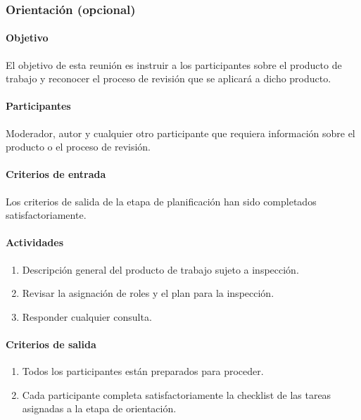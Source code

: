 \subsubsection{Orientación (opcional)}

\paragraph{Objetivo\\}

El objetivo de esta reunión es instruir a los participantes sobre el producto de trabajo y reconocer el proceso de revisión que se aplicará a dicho producto.

\paragraph{Participantes\\}

Moderador, autor y cualquier otro participante que requiera información sobre el producto o el proceso de revisión.

\paragraph{Criterios de entrada\\}

Los criterios de salida de la etapa de planificación han sido completados satisfactoriamente.

\paragraph{Actividades}

\begin{enumerate}
	\item 
		Descripción general del producto de trabajo sujeto a inspección.
	\item
		Revisar la asignación de roles y el plan para la inspección.
	\item
		Responder cualquier consulta.
\end{enumerate}

\paragraph{Criterios de salida}

\begin{enumerate}
	\item 
		Todos los participantes están preparados para proceder.
	\item 
		Cada participante completa satisfactoriamente la checklist de las tareas asignadas a la etapa de orientación.
\end{enumerate}

